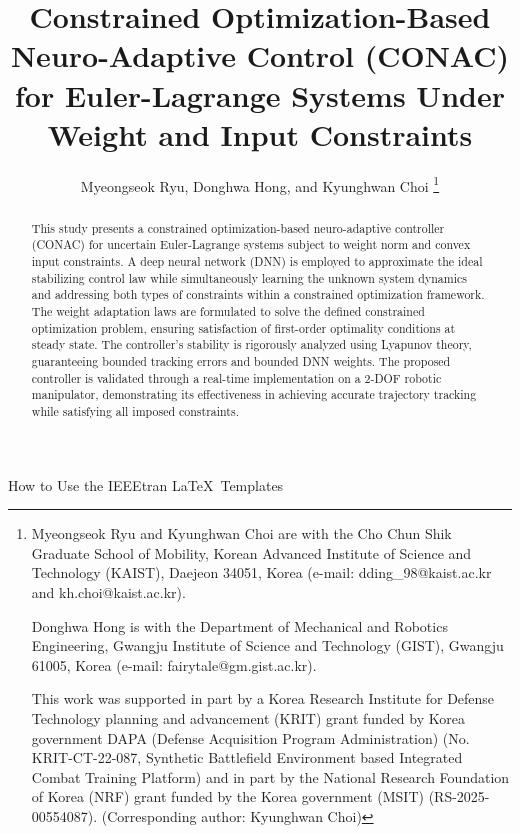 \documentclass[lettersize,journal]{IEEEtran}
\begin{document}
\title{
    Constrained Optimization-Based Neuro-Adaptive Control (CONAC) for Euler-Lagrange Systems Under Weight and Input Constraints
} %

\author{
  Myeongseok Ryu, Donghwa Hong, and Kyunghwan Choi
\thanks{
    Myeongseok Ryu and Kyunghwan Choi are with the Cho Chun Shik Graduate School of Mobility, Korean Advanced Institute of Science and Technology (KAIST), Daejeon 34051, Korea (e-mail: dding\_98@kaist.ac.kr and kh.choi@kaist.ac.kr).

    Donghwa Hong is with the Department of Mechanical and Robotics Engineering, Gwangju Institute of Science and Technology (GIST), Gwangju 61005, Korea (e-mail: fairytale@gm.gist.ac.kr).

    This work was supported in part by a Korea Research Institute for Defense Technology planning and advancement (KRIT) grant funded by Korea government DAPA (Defense Acquisition Program Administration) (No. KRIT-CT-22-087, Synthetic Battlefield Environment based Integrated Combat Training Platform) and in part by the National Research Foundation of Korea (NRF) grant funded by the Korea government (MSIT) (RS-2025- 00554087). (Corresponding author: Kyunghwan Choi)
    }}

%
{How to Use the IEEEtran \LaTeX \ Templates}

\maketitle

\begin{abstract}
  This study presents a constrained optimization-based neuro-adaptive controller (CONAC) for uncertain Euler-Lagrange systems subject to weight norm and convex input constraints. 
  A deep neural network (DNN) is employed to approximate the ideal stabilizing control law while simultaneously learning the unknown system dynamics and addressing both types of constraints within a constrained optimization framework.
  The weight adaptation laws are formulated to solve the defined constrained optimization problem, ensuring satisfaction of first-order optimality conditions at steady state.
  The controller's stability is rigorously analyzed using Lyapunov theory, guaranteeing bounded tracking errors and bounded DNN weights. 
  The proposed controller is validated through a real-time implementation on a 2-DOF robotic manipulator, demonstrating its effectiveness in achieving accurate trajectory tracking while satisfying all imposed constraints.
\end{abstract}
\end{document}
